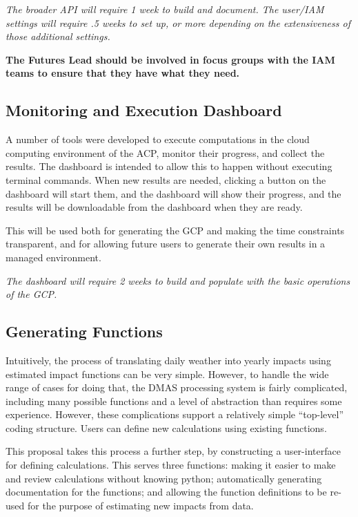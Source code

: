 \documentclass[12pt, oneside]{amsart}
\begin{document}
{\it The broader API will require 1 week to build and document.  The
  user/IAM settings will require .5 weeks to set up, or more depending
  on the extensiveness of those additional settings.}

{\bf The Futures Lead should be involved in focus groups with the IAM
  teams to ensure that they have what they need.}

\subsection{Monitoring and Execution Dashboard}
\label{sec:dashboard}

A number of tools were developed to execute computations in the cloud
computing environment of the ACP, monitor their progress, and collect
the results.  The dashboard is intended to allow this to happen
without executing terminal commands.  When new results are needed,
clicking a button on the dashboard will start them, and the dashboard
will show their progress, and the results will be downloadable from
the dashboard when they are ready.

This will be used both for generating the GCP and making the time
constraints transparent, and for allowing future users to generate
their own results in a managed environment.

{\it The dashboard will require 2 weeks to build and populate with the
  basic operations of the GCP.}

\subsection{Generating Functions}
\label{sec:functiongen}

Intuitively, the process of translating daily weather into yearly impacts using estimated impact functions can be very simple.  However, to handle the wide range of cases for doing that, the DMAS processing system is fairly complicated, including many possible functions and a level of abstraction than requires some experience.  However, these complications support a relatively simple ``top-level'' coding structure.  Users can define new calculations using existing functions.

This proposal takes this process a further step, by constructing a user-interface for defining calculations.  This serves three functions: making it easier to make and review calculations without knowing python; automatically generating documentation for the functions; and allowing the function definitions to be re-used for the purpose of estimating new impacts from data.
\end{document}
